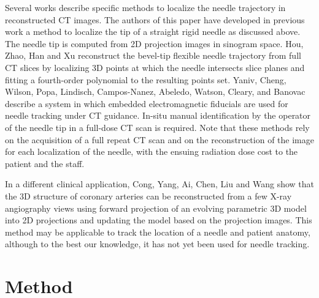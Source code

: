 Several works describe specific methods to localize the needle trajectory in reconstructed CT images. The authors of this paper have developed in previous work a method to localize the tip of a straight rigid needle \cite{medan2017reduced} as discussed above. The needle tip  is computed from 2D projection images in sinogram space. 
Hou, Zhao, Han and Xu \cite{huo2015shape} reconstruct the bevel-tip flexible needle trajectory from full CT slices by localizing 3D points at which the needle intersects slice planes and fitting a fourth-order polynomial to the resulting points set.
Yaniv, Cheng, Wilson, Popa, Lindisch, Campos-Nanez, Abeledo, Watson, Cleary, and Banovac \cite{yaniv2010needle} describe a system in which embedded electromagnetic fiducials are used for needle tracking under CT guidance. In-situ manual identification by the operator of the needle tip in a full-dose CT scan is required. Note that these methods rely on the acquisition of a full repeat CT scan and on the reconstruction of the image for each localization of the needle, with the ensuing radiation dose cost to the patient and the staff.

In a different clinical application, Cong, Yang, Ai, Chen, Liu and Wang \cite{cong2015quantitative} show that the 3D structure of coronary arteries can be reconstructed from a few X-ray angiography views using forward projection of an evolving parametric 3D model into 2D projections and updating the model based on the projection images. This method may be applicable to track the location of a needle and patient anatomy, although to the best our knowledge, it has not yet been used for needle tracking. 

\section*{Method}

